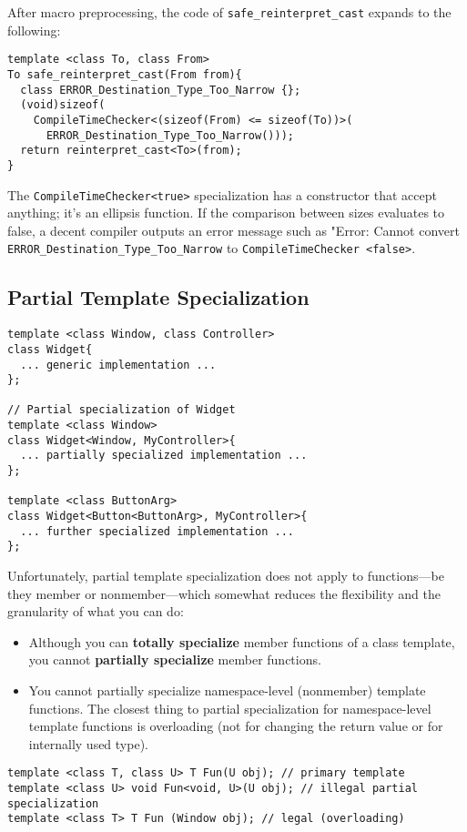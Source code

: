 After macro preprocessing, the code of \texttt{safe\_reinterpret\_cast}
expands to the following:

\begin{verbatim}
template <class To, class From>
To safe_reinterpret_cast(From from){
  class ERROR_Destination_Type_Too_Narrow {};
  (void)sizeof(
    CompileTimeChecker<(sizeof(From) <= sizeof(To))>(
      ERROR_Destination_Type_Too_Narrow()));
  return reinterpret_cast<To>(from);
}
\end{verbatim}

The \texttt{CompileTimeChecker<true>} specialization has a constructor
that accept anything; it's an ellipsis function. If the comparison
between sizes evaluates to false, a decent compiler outputs an error
message such as "Error: Cannot convert
\texttt{ERROR\_Destination\_Type\_Too\_Narrow} to
\texttt{CompileTimeChecker <false>}.

\subsection{Partial Template Specialization}

\begin{verbatim}
template <class Window, class Controller>
class Widget{
  ... generic implementation ...
};

// Partial specialization of Widget
template <class Window>
class Widget<Window, MyController>{
  ... partially specialized implementation ...
};

template <class ButtonArg>
class Widget<Button<ButtonArg>, MyController>{
  ... further specialized implementation ...
};
\end{verbatim}

Unfortunately, partial template specialization does not apply to
functions—be they member or nonmember—which somewhat reduces the
flexibility and the granularity of what you can do:
\begin{itemize}
\item Although you can \textbf{totally specialize} member functions of
  a class template, you cannot \textbf{partially specialize} member
  functions.
\item You cannot partially specialize namespace-level (nonmember)
  template functions. The closest thing to partial specialization for
  namespace-level template functions is overloading (not for changing the
  return value or for internally used type).
\end{itemize}

\begin{verbatim}
template <class T, class U> T Fun(U obj); // primary template
template <class U> void Fun<void, U>(U obj); // illegal partial specialization
template <class T> T Fun (Window obj); // legal (overloading)
\end{verbatim}

